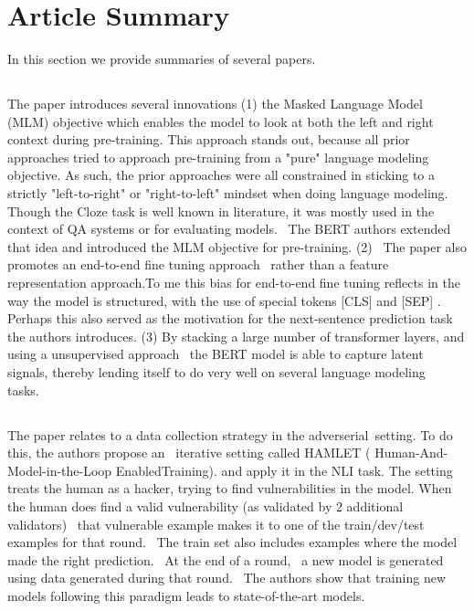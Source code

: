 \section{Article Summary}
\label{sec:articlesummary}

In this section we provide summaries of several papers.

\subsection{\cite{devlin-etal-2019-bert}}
\label{subsec:devlin-etal}

The paper introduces several innovations (1) the Masked Language Model (MLM) objective which enables the model to look at both the left and right context during pre-training. This approach stands out, because all prior approaches tried to approach pre-training from a "pure" language modeling objective. As such, the prior approaches were all constrained in sticking to a strictly "left-to-right" or "right-to-left" mindset when doing language modeling. Though the Cloze task is well known in literature, it was mostly used in the context of QA systems or for evaluating models.  The BERT authors extended that idea and introduced the MLM objective for pre-training. (2)  The paper also promotes an end-to-end fine tuning approach  rather than a feature representation approach.To me this bias for end-to-end fine tuning reflects in the way the model is structured, with the use of special tokens [CLS] and [SEP] . Perhaps this also served as the motivation for the next-sentence prediction task the authors introduces. (3) By stacking a large number of transformer layers, and using a unsupervised approach  the BERT model is able to capture latent signals, thereby lending itself to do very well on several language modeling tasks.  

\subsection{\cite{nie2019adversarial}}
\label{subsec:nie2019adversarial}

The paper relates to a data collection strategy in the adverserial setting. To do this, the authors propose an  iterative setting called HAMLET ( Human-And-Model-in-the-Loop EnabledTraining). and apply it in the NLI task. The setting treats the human as a hacker, trying to find vulnerabilities in the model. When the human does find a valid vulnerability (as validated by 2 additional validators)  that vulnerable example makes it to one of the train/dev/test  examples for that round.  The train set also includes examples where the model made the right prediction.  At the end of a round,  a new model is generated using data generated during that round.  The authors show that training new models following this paradigm leads to state-of-the-art models.

